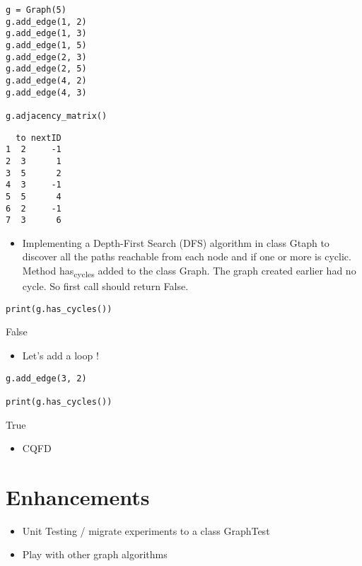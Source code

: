 \documentclass[11pt]{article}
\begin{document}
\begin{verbatim}
g = Graph(5)
g.add_edge(1, 2)
g.add_edge(1, 3)
g.add_edge(1, 5)
g.add_edge(2, 3)
g.add_edge(2, 5)
g.add_edge(4, 2)
g.add_edge(4, 3)

g.adjacency_matrix()
\end{verbatim}

\begin{verbatim}
  to nextID
1  2     -1
2  3      1
3  5      2
4  3     -1
5  5      4
6  2     -1
7  3      6
\end{verbatim}


\begin{itemize}
\item Implementing a Depth-First Search (DFS) algorithm in class Gtaph to discover
all the paths reachable from each node and if one or more is cyclic. Method
has\textsubscript{cycles} added to the class Graph.  The graph created earlier had no
cycle. So first call should return False.
\end{itemize}

\begin{verbatim}
print(g.has_cycles())
\end{verbatim}

False

\begin{itemize}
\item Let's add a loop !
\end{itemize}

\begin{verbatim}
g.add_edge(3, 2)

print(g.has_cycles())
\end{verbatim}

True

\begin{itemize}
\item CQFD
\end{itemize}

\section{Enhancements}
\label{sec:orgbd4ba14}
\begin{itemize}
\item Unit Testing / migrate experiments to a class GraphTest
\item Play with other graph algorithms
\end{itemize}
\end{document}
